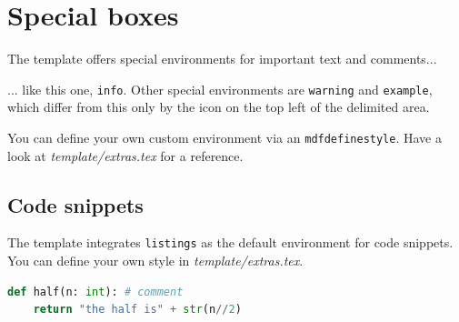 \section{Special boxes}\label{sec:boxes}

The template offers special environments for important text and comments...
\begin{info}
... like this one, \texttt{info}. Other special environments are \texttt{warning} and \texttt{example}, which differ from this only by the icon on the top left of the delimited area.
\end{info}
You can define your own custom environment via an \texttt{mdfdefinestyle}.
Have a look at \textit{template/extras.tex} for a reference.

\subsection{Code snippets}

The template integrates \texttt{listings} as the default environment for code snippets. You can define your own style in \textit{template/extras.tex}.

\begin{lstlisting}[language=Python]
def half(n: int): # comment
    return "the half is" + str(n//2)
\end{lstlisting}

